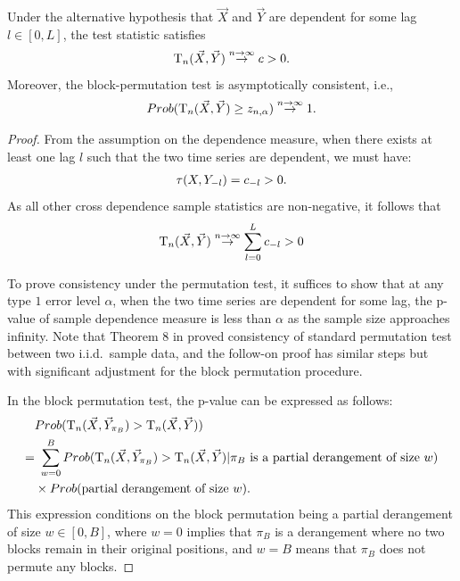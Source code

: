 \begin{theorem}
     Under the alternative hypothesis that $\vec{X}$ and $\vec{Y}$ are dependent for some lag $l \in [0,L]$, the test statistic satisfies 
    \begin{align*}
       \mathrm{T}_{n}(\vec{X}, \vec{Y}) \stackrel{n\rightarrow \infty}{\rightarrow} c>0.
       \end{align*}
    Moreover, the block-permutation test is asymptotically consistent, i.e., 
    \begin{align*}
       Prob(\mathrm{T}_{n}(\vec{X}, \vec{Y}) \geq z_{n,\alpha}) \stackrel{n\rightarrow \infty}{\rightarrow} 1.
       \end{align*}
\end{theorem}
\begin{proof}
From the assumption on the dependence measure, when there exists at least one lag $l$ such that the two time series are dependent, we must have:
\begin{align*}
\tau(X, Y_{-l}) = c_{-l} >0.
\end{align*}
As all other cross dependence sample statistics are non-negative, it follows that
\begin{align*}
\mathrm{T}_{n}(\vec{X}, \vec{Y}) \stackrel{n \rightarrow \infty}{\rightarrow} \sum_{l=0}^{L}c_{-l} > 0
\end{align*}

To prove consistency under the permutation test, it suffices to show that at any type $1$ error level $\alpha$, when the two time series are dependent for some lag, the p-value of sample dependence measure is less than $\alpha$ as the sample size approaches infinity. Note that Theorem 8 in \cite{mgc-jasa} proved consistency of standard permutation test between two i.i.d.~sample data, and the follow-on proof has similar steps but with significant adjustment for the block permutation procedure.

In the block permutation test, the p-value can be expressed as follows:
\begin{align*}
& Prob(\mathrm{T}_{n}(\vec{X}, \vec{Y}_{\pi_B}) > \mathrm{T}_{n}(\vec{X}, \vec{Y})) \\
= &\ \sum_{w=0}^{B} Prob(\mathrm{T}_{n}(\vec{X}, \vec{Y}_{\pi_B}) > \mathrm{T}_{n}(\vec{X}, \vec{Y}) | \pi_B \mbox{ is a partial derangement of size $w$})\\
& \times Prob(\mbox{partial derangement of size $w$}).
\end{align*}
This expression conditions on the block permutation being a partial derangement of size $w \in [0,B]$, where $w=0$ implies that $\pi_{B}$ is a derangement where no two blocks remain in their original positions, and $w=B$ means that $\pi_{B}$ does not permute any blocks.


\end{proof}
